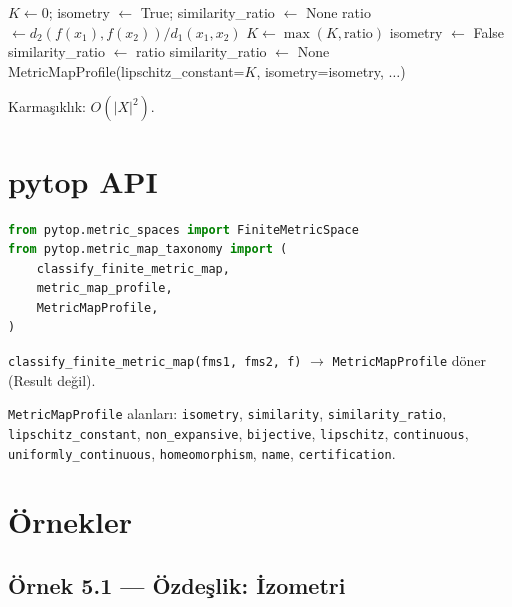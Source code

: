 \begin{algorithm}
\caption{ClassifyMap$(X, d_1, Y, d_2, f)$}
\begin{algorithmic}[1]
\State $K \leftarrow 0$; isometry $\leftarrow$ True; similarity\_ratio $\leftarrow$ None
    \State ratio $\leftarrow d_2(f(x_1),f(x_2)) / d_1(x_1,x_2)$
    \State $K \leftarrow \max(K, \text{ratio})$
        \State isometry $\leftarrow$ False
    \EndIf
        \State similarity\_ratio $\leftarrow$ ratio
        \State similarity\_ratio $\leftarrow$ None
    \EndIf
\EndFor
\State \Return MetricMapProfile(lipschitz\_constant=$K$, isometry=isometry, $\ldots$)
\end{algorithmic}
\end{algorithm}

Karmaşıklık: $O(|X|^2)$.

\section{pytop API}

\begin{lstlisting}[language=Python]
from pytop.metric_spaces import FiniteMetricSpace
from pytop.metric_map_taxonomy import (
    classify_finite_metric_map,
    metric_map_profile,
    MetricMapProfile,
)
\end{lstlisting}

\texttt{classify\_finite\_metric\_map(fms1, fms2, f)} $\to$ \texttt{MetricMapProfile} döner (Result değil).

\texttt{MetricMapProfile} alanları: \texttt{isometry}, \texttt{similarity}, \texttt{similarity\_ratio},
\texttt{lipschitz\_constant}, \texttt{non\_expansive}, \texttt{bijective}, \texttt{lipschitz},
\texttt{continuous}, \texttt{uniformly\_continuous}, \texttt{homeomorphism}, \texttt{name}, \texttt{certification}.

\section{Örnekler}

\subsection*{Örnek 5.1 — Özdeşlik: İzometri}

